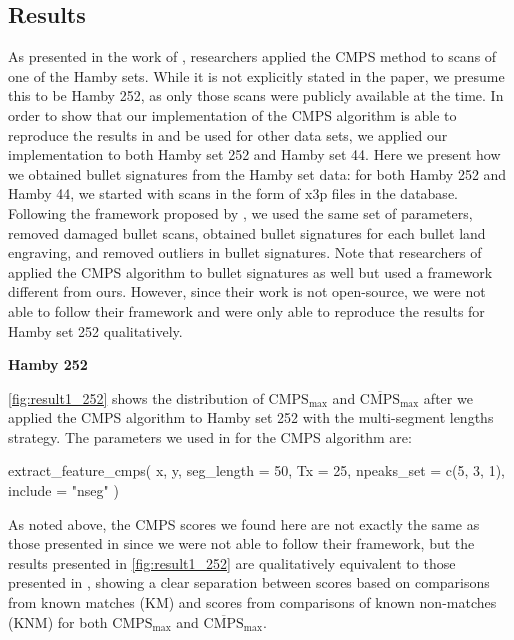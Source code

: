 \hypertarget{results}{%
\subsection{Results}\label{results}}

As presented in the work of \citet{cmps}, researchers applied the CMPS
method to scans of one of the Hamby sets. While it is not explicitly
stated in the paper, we presume this to be Hamby 252, as only those
scans were publicly available at the time. In order to show that our
implementation of the CMPS algorithm is able to reproduce the results in
\citet{cmps} and be used for other data sets, we applied our
implementation to both Hamby set 252 and Hamby set 44. Here we present
how we obtained bullet signatures from the Hamby set data: for both
Hamby 252 and Hamby 44, we started with scans in the form of x3p files
in the database. Following the framework proposed by \citet{aoas}, we
used the same set of parameters, removed damaged bullet scans, obtained
bullet signatures for each bullet land engraving, and removed outliers
in bullet signatures. Note that researchers of \citet{cmps} applied the
CMPS algorithm to bullet signatures as well but used a framework
different from ours. However, since their work is not open-source, we
were not able to follow their framework and were only able to reproduce
the results for Hamby set 252 qualitatively.

\textbf{Hamby 252}

\autoref{fig:result1_252} shows the distribution of
\(\mathrm{CMPS_{max}}\) and \(\mathrm{\overline{CMPS}_{max}}\) after we
applied the CMPS algorithm to Hamby set 252 with the multi-segment
lengths strategy. The parameters we used in
 for the CMPS algorithm are:

\begin{Schunk}
\begin{Sinput}
extract_feature_cmps(
  x, y,
  seg_length = 50,
  Tx = 25,
  npeaks_set = c(5, 3, 1),
  include = "nseg"
)
\end{Sinput}
\end{Schunk}

As noted above, the CMPS scores we found here are not exactly the same
as those presented in \citet{cmps} since we were not able to follow
their framework, but the results presented in \autoref{fig:result1_252}
are qualitatively equivalent to those presented in \citet{cmps}, showing
a clear separation between scores based on comparisons from known
matches (KM) and scores from comparisons of known non-matches (KNM) for
both \(\mathrm{CMPS_{max}}\) and \(\mathrm{\overline{CMPS}_{max}}\).

